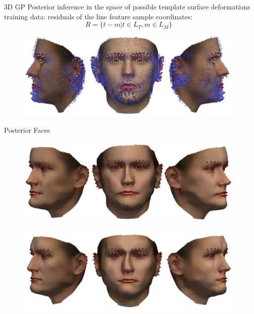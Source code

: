 \documentclass[xcolor=x11names,compress]{beamer}
\begin{document}
\begin{frame}{3D GP Posterior}
inference in the space of possible template surface deformations\\
\bigskip
training data: residuals of the line feature sample coordinates:        
\begin{equation*}
R = \{t - m \vert t \in L_{T}, m \in L_{M}\} 
\end{equation*}
\begin{figure}   
\centering
\includegraphics[width=.8\textwidth]{../resources/img/posterior_deformations.pdf}
\end{figure}

\end{frame}

\begin{frame}{Posterior Faces}
    \begin{figure}
        \centering
        \includegraphics[width=.9\textwidth]{../resources/img/posterior_sample_17.pdf}
    \end{figure}
    \begin{figure}
        \centering
        \includegraphics[width=.9\textwidth]{../resources/img/posterior_sample_23.pdf}
    \end{figure}
\end{frame}
\end{document}

